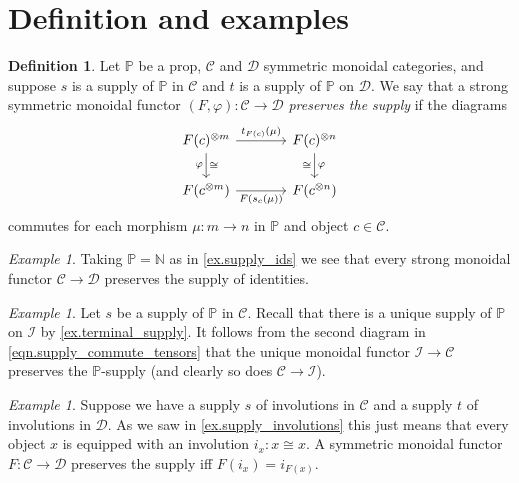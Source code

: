 \documentclass[11pt, oneside, article]{memoir}
\theoremstyle{plain}
\theoremstyle{definition}
\newtheorem{definition}[theorem]{Definition}
\theoremstyle{remark}
\newtheorem{example}[theorem]{Example}
\newcommand{\cat}[1]{\mathcal{#1}}%
\newcommand{\tpow}[1]{^{\otimes #1}}
\newcommand{\nn}{\mathbb{N}}
\newcommand{\pp}{\mathbb{P}}
\newcommand{\zero}{\cat{I}}
\begin{document}
\section{Definition and examples}\label{sec.pres_supply}

\begin{definition}\label{def.preserve_supply}
Let $\pp$ be a prop, $\cat{C}$ and $\cat{D}$ symmetric monoidal categories, and suppose $s$ is a supply of $\pp$ in $\cat{C}$ and $t$ is a supply of $\pp$ on $\cat{D}$. We say that a strong symmetric monoidal functor $(F,\varphi)\colon\cat{C}\to\cat{D}$ \emph{preserves the supply} if the diagrams 
\begin{equation}\label{eqn.unpack_preserve_supply}
	\begin{tikzcd}[column sep=large]
  	F(c)\tpow{m}\ar[r, "t_{F(c)}(\mu)"]\ar[d, "\varphi"', "\cong"]&
  	F(c)\tpow{n}\ar[d, "\varphi", "\cong"']\\
  	F(c\tpow{m})\ar[r, "F(s_c(\mu))"']&
  	F(c\tpow{n})
  \end{tikzcd}
\end{equation}
commutes for each morphism $\mu\colon m\to n$ in $\pp$ and object $c\in\cat{C}$.
\end{definition}

\begin{example}
Taking $\pp=\nn$ as in \cref{ex.supply_ids} we see that every strong monoidal functor $\cat{C}\to\cat{D}$ preserves the supply of identities.
\end{example}

\begin{example}
Let $s$ be a supply of $\pp$ in $\cat{C}$. Recall that there is a unique supply of $\pp$ on $\zero$ by \cref{ex.terminal_supply}. It follows from the second diagram in \cref{eqn.supply_commute_tensors} that the unique monoidal functor $\zero\to\cat{C}$ preserves the $\pp$-supply (and clearly so does $\cat{C}\to\zero$).
\end{example}

\begin{example}\label{ex.preserve_involutions}
Suppose we have a supply $s$ of involutions in $\cat{C}$ and a supply $t$ of involutions in $\cat{D}$. As we saw in \cref{ex.supply_involutions} this just means that every object $x$ is equipped with an involution $i_x\colon x\cong x$. A symmetric monoidal functor $F\colon\cat{C}\to\cat{D}$ preserves the supply iff $F(i_x)=i_{F(x)}$.
\end{example}
\end{document}
